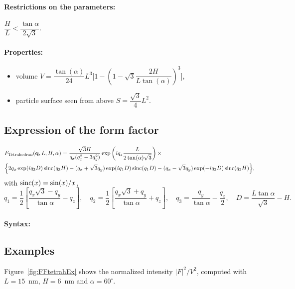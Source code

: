 \paragraph{Restrictions on the parameters:} $\dfrac{H}{L}< \dfrac{\tan{\alpha}}{2\sqrt{3}}$.

\paragraph{Properties:}
\begin{itemize}
\item volume $V= \dfrac{\tan(\alpha)}{24} L^3\Big[1- (1 -
  \sqrt{3}\dfrac{2H}{L \tan(\alpha)} )^3\Big]$,
\item particle surface seen from above $S =\dfrac{\sqrt{3}}{4}L^2$.
\end{itemize}

\subsection{Expression of the form factor}

\begin{align*}
&F_{\rm{Tetrahedron}} (\mathbf{q}, L, H, \alpha)=\frac{\sqrt{3}H}{q_x (q_x^2-3q_y^2)}
\exp\left(iq_z \frac{L}{2\tan (\alpha)\sqrt{3}}\right) \times \\
&\Big\{2q_x \exp(iq_3 D)\operatorname{sinc}(q_3 H) - (q_x +\sqrt{3}q_y)
\exp(iq_1 D)\operatorname{sinc}(q_1 D) -(q_x-\sqrt{3}q_y)\exp(-iq_2
D)\operatorname{sinc}(q_2 H) \Big\}, 
\end{align*}
with $\operatorname{sinc}(x)=\sin(x)/x$,
\begin{equation*}
q_1  =\frac{1}{2}\left[\frac{q_x\sqrt{3} -q_y}{\tan \alpha}-q_z \right],
\quad q_2 = \frac{1}{2}\left[\frac{q_x\sqrt{3} +q_y}{\tan \alpha}+q_z
\right], \quad 
q_3 = \frac{q_y}{\tan \alpha} -\frac{q_z}{2}, \quad D = \frac{L \tan \alpha}{\sqrt{3}} -H.
\end{equation*}

\paragraph{Syntax:} 

\subsection{Examples}
Figure~\ref{fig:FFtetrahEx} shows the normalized intensity
$|F|^2/V^2$, computed with $L=15$~nm, $H=6$~nm and $\alpha =60
^{\circ}$.

